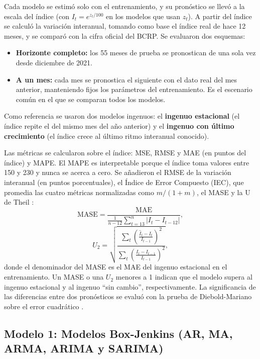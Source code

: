 \documentclass[conference]{IEEEtran}
\begin{document}
Cada modelo se estimó solo con el entrenamiento, y su pronóstico se llevó a la escala del índice (con $I_t = e^{z_t/100}$ en los modelos que usan $z_t$). A partir del índice se calculó la variación interanual, tomando como base el índice real de hace 12 meses, y se comparó con la cifra oficial del BCRP. Se evaluaron dos esquemas:
\begin{itemize}[leftmargin=*]
  \item \textbf{Horizonte completo:} los 55 meses de prueba se pronostican de una sola vez desde diciembre de 2021.
  \item \textbf{A un mes:} cada mes se pronostica el siguiente con el dato real del mes anterior, manteniendo fijos los parámetros del entrenamiento. Es el escenario común en el que se comparan todos los modelos.
\end{itemize}
Como referencia se usaron dos modelos ingenuos: el \textbf{ingenuo estacional} (el índice repite el del mismo mes del año anterior) y el \textbf{ingenuo con último crecimiento} (el índice crece al último ritmo interanual conocido).

Las métricas se calcularon sobre el índice: MSE, RMSE y MAE (en puntos del índice) y MAPE. El MAPE es interpretable porque el índice toma valores entre 150 y 230 y nunca se acerca a cero. Se añadieron el RMSE de la variación interanual (en puntos porcentuales), el Índice de Error Compuesto (IEC), que promedia las cuatro métricas normalizadas como $m/(1+m)$, el MASE \cite{hyndman2006} y la U de Theil \cite{theil1966}:
\begin{equation}
\mathrm{MASE} = \frac{\mathrm{MAE}}{\frac{1}{n-12}\sum_{t=13}^{n}\lvert I_t - I_{t-12}\rvert},
\label{eq:mase}
\end{equation}
\begin{equation}
U_2 = \sqrt{\frac{\sum_t \left(\frac{\hat{I}_t - I_t}{I_{t-1}}\right)^2}{\sum_t \left(\frac{I_t - I_{t-1}}{I_{t-1}}\right)^2}},
\label{eq:theil}
\end{equation}
donde el denominador del MASE es el MAE del ingenuo estacional en el entrenamiento. Un MASE o una $U_2$ menores a 1 indican que el modelo supera al ingenuo estacional y al ingenuo ``sin cambio'', respectivamente. La significancia de las diferencias entre dos pronósticos se evaluó con la prueba de Diebold-Mariano sobre el error cuadrático \cite{diebold1995}.

\subsection{Modelo 1: Modelos Box-Jenkins (AR, MA, ARMA, ARIMA y SARIMA)}
\end{document}
